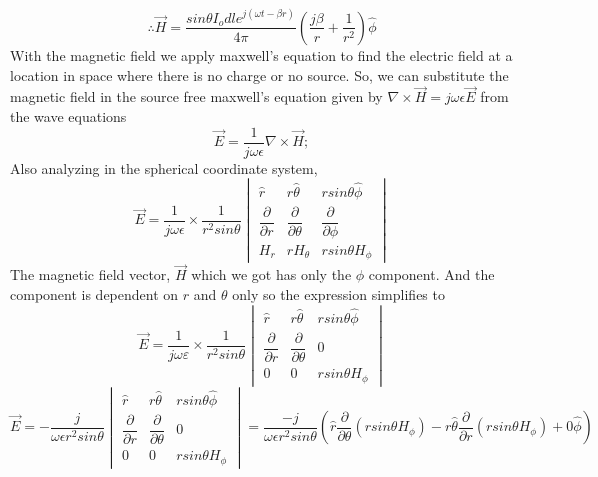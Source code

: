 	\begin{equation}
	\therefore \vec{H} = \dfrac{sin\theta I_o dl e^{j(\omega t-\beta r)} }{4\pi} \left(\dfrac{j\beta}{r} + \dfrac{1}{r^2}\right)\hat{\phi}
	\end{equation}
	With the magnetic field we apply maxwell's equation to find the electric field at a location in space where there is no charge or no source. So, we can substitute the magnetic field in the source free maxwell's equation given by $\nabla \times \vec{H} = j\omega \epsilon\vec{E}$ from the wave equations 
	$$\vec{E} = \dfrac{1}{j\omega \epsilon}\nabla \times \vec{H};$$Also analyzing in  the spherical coordinate system, 
	\begin{equation*}
	\vec{E}  = \dfrac{1}{j\omega \epsilon} \times \dfrac{1}{r^2sin\theta}
	\begin{vmatrix}
	\hat{r} & r\hat{\theta} & rsin\theta\hat{\phi} \\ 
	\dfrac{\partial}{\partial r} & \dfrac{\partial}{\partial \theta} &  \dfrac{\partial}{\partial \phi} \\
	H_r & rH_\theta & rsin\theta H_\phi              
	\end{vmatrix}
	\end{equation*}
	The magnetic field vector, $\vec{H}$ which we got has only the $\phi$ component. And the component is dependent on $r$ and $\theta$ only so the expression simplifies to 
	\begin{equation*}
	\vec{E}  = \dfrac{1}{j\omega \varepsilon} \times \dfrac{1}{r^2sin\theta}
	\begin{vmatrix}
	\hat{r} & r\hat{\theta} & rsin\theta\hat{\phi} \\ 
	\dfrac{\partial}{\partial r} & \dfrac{\partial}{\partial \theta} &  0 \\
	0 & 0 & rsin\theta H_\phi              
	\end{vmatrix}
	\end{equation*}
	\begin{dmath*}
	\vec{E}  = -\dfrac{j}{\omega \epsilon r^2sin\theta}
	\begin{vmatrix}
	\hat{r} & r\hat{\theta} & rsin\theta\hat{\phi} \\ 
	\dfrac{\partial}{\partial r} & \dfrac{\partial}{\partial \theta} &  0 \\
	0 & 0 & rsin\theta H_\phi              
	\end{vmatrix}  = \dfrac{-j}{\omega  \epsilon r^2 sin\theta}\left(\hat{r} \dfrac{\partial}{\partial \theta}\left(rsin \theta H_{\phi}\right) - r\hat{\theta} \dfrac{\partial}{\partial r}(rsin\theta H_{\phi}) + 0\hat{\phi}\right)
	\end{dmath*}
	
